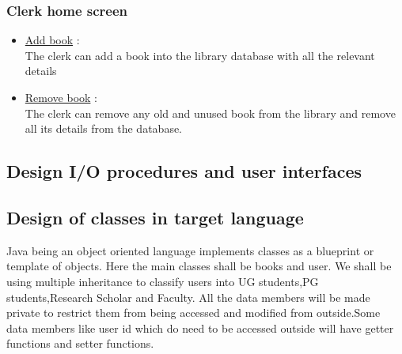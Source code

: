 \documentclass[a4paper]{article}
\begin{document}
\subsubsection*{Clerk home screen}
\begin{itemize}
\item \underline{Add book} :\\ The clerk can add a book into the library database with all the relevant details
\item \underline{Remove book} :\\ The clerk can remove any old and unused book from the library and remove all its details from the database.
\end{itemize}

\subsection{Design I/O procedures and user interfaces}


\subsection{Design of classes in target language}
Java being an object oriented language implements classes  as a blueprint or template of objects. Here the main classes shall be books and user.
We shall be using multiple inheritance to classify users into UG students,PG students,Research Scholar and Faculty.
All the data members will be made private to restrict them from being accessed and modified from outside.Some data members like user id which do need to be accessed outside will have getter functions and setter functions. 
\end{document}
